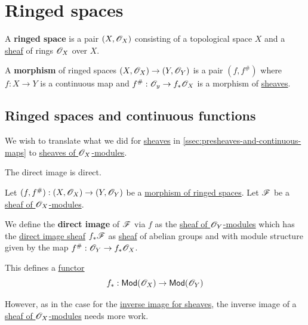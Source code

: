 \documentclass[../../../main]{subfiles}
\begin{document}
\section{Ringed spaces} \label{sec:ringed-spaces}

\begin{definition} \label{def:ringed-space}
  A \textbf{ringed space} is a pair \((X, \mathscr{O}_{X})\) consisting of a topological space \(X\) and a \hyperref[def:sheaf]{sheaf} of rings \(\mathscr{O}_{X}\) over \(X\).

  A \textbf{morphism} of ringed spaces \((X, \mathscr{O}_{X}) \to (Y, \mathscr{O}_{Y})\) is a pair \((f, f^{\#})\) where \(f: X \to Y\) is a continuous map and \(f^{\#}: \mathscr{O}_{y} \to f_{\ast}\mathscr{O}_{X}\) is a morphism of \hyperref[def:sheaf]{sheaves}.
\end{definition}

\subsection{Ringed spaces and continuous functions}

We wish to translate what we did for \hyperref[def:sheaf]{sheaves} in \autoref{ssec:presheaves-and-continuous-maps} to \hyperref[def:sheaf-of-modules]{sheaves of \(\mathscr{O}_{X}\)-modules}.

The direct image is direct.
\begin{definition} \label{def:direct-image-ox-mod}
  Let \((f, f^{\#}): (X, \mathscr{O}_{X}) \to (Y, \mathscr{O}_{Y})\) be a \hyperref[def:ringed-space]{morphism of ringed spaces}.
  Let \(\mathscr{F}\) be a \hyperref[def:sheaf-of-modules]{sheaf of \(\mathscr{O}_{X}\)-modules}.

  We define the \textbf{direct image} of \(\mathscr{F}\) via \(f\) as the \hyperref[def:sheaf-of-modules]{sheaf of \(\mathscr{O}_{Y}\)-modules} which has the \hyperref[def:direct-image-sheaf]{direct image sheaf} \(f_{\ast}\mathscr{F}\) as \hyperref[def:sheaf]{sheaf} of abelian groups and with module structure given by the map \(f^{\#}: \mathscr{O}_{Y} \to f_{\ast}\mathscr{O}_{X}\).

  This defines a \hyperref[def:functor]{functor}
  \begin{equation*}
    f_{\ast}: \mathsf{Mod}(\mathscr{O}_{X}) \to \mathsf{Mod}(\mathscr{O}_{Y})
  \end{equation*}
\end{definition}

However, as in the case for the \hyperref[def:inverse-image-sheaf]{inverse image for sheaves}, the inverse image of a \hyperref[def:sheaf-of-modules]{sheaf of \(\mathscr{O}_{X}\)-modules} needs more work.
\end{document}
